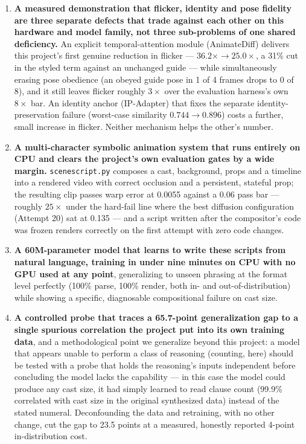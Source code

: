 \documentclass[11pt]{article}
\begin{document}
\begin{enumerate}
\item \textbf{A measured demonstration that flicker, identity and pose
  fidelity are three separate defects that trade against each other on
  this hardware and model family, not three sub-problems of one shared
  deficiency.} An explicit temporal-attention module (AnimateDiff)
  delivers this project's first genuine reduction in flicker ---
  $36.2\times \rightarrow 25.0\times$, a 31\% cut in the styled term
  against an unchanged guide --- while simultaneously erasing pose
  obedience (an obeyed guide pose in 1 of 4 frames drops to 0 of 8), and it
  still leaves flicker roughly $3\times$ over the evaluation harness's own
  $8\times$ bar. An identity anchor (IP-Adapter) that fixes the separate
  identity-preservation failure (worst-case similarity $0.744 \rightarrow
  0.896$) costs a further, small increase in flicker. Neither mechanism
  helps the other's number.

\item \textbf{A multi-character symbolic animation system that runs
  entirely on CPU and clears the project's own evaluation gates by a wide
  margin.} \texttt{scenescript.py} composes a cast, background, props and
  a timeline into a rendered video with correct occlusion and a
  persistent, stateful prop; the resulting clip passes warp error at
  0.0055 against a 0.06 pass bar --- roughly $25\times$ under the
  hard-fail line where the best diffusion configuration (Attempt 20) sat
  at 0.135 --- and a script written after the compositor's code was frozen
  renders correctly on the first attempt with zero code changes.

\item \textbf{A 60M-parameter model that learns to write these scripts
  from natural language, training in under nine minutes on CPU with no GPU
  used at any point}, generalizing to unseen phrasing at the format level
  perfectly (100\% parse, 100\% render, both in- and out-of-distribution)
  while showing a specific, diagnosable compositional failure on cast
  size.

\item \textbf{A controlled probe that traces a 65.7-point generalization
  gap to a single spurious correlation the project put into its own
  training data}, and a methodological point we generalize beyond this
  project: a model that appears unable to perform a class of reasoning
  (counting, here) should be tested with a probe that holds the
  reasoning's inputs independent before concluding the model lacks the
  capability --- in this case the model could produce any cast size, it
  had simply learned to read clause count (99.9\% correlated with cast
  size in the original synthesized data) instead of the stated numeral.
  Deconfounding the data and retraining, with no other change, cut the gap
  to 23.5 points at a measured, honestly reported 4-point in-distribution
  cost.


\end{enumerate}
\end{document}
